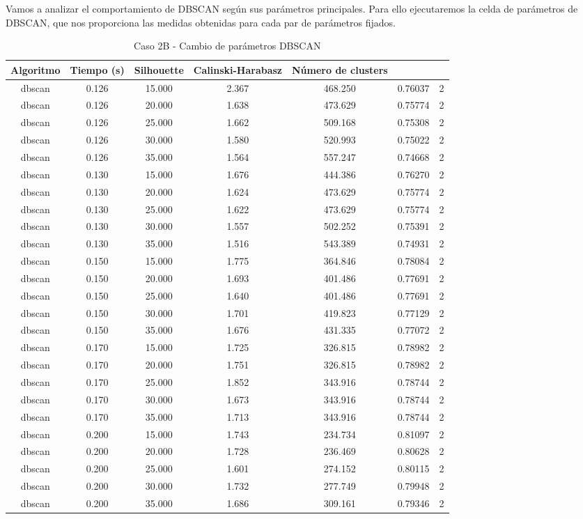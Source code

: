 Vamos a analizar el comportamiento de DBSCAN según sus parámetros principales. Para ello ejecutaremos la celda de parámetros de DBSCAN, que nos proporciona las medidas obtenidas para cada par de parámetros fijados.

\begin{table}[H]
\centering
\caption{Caso 2B - Cambio de parámetros DBSCAN}
\label{tab:c2B_dbscan}
\begin{tabular}{ccccccc}
\toprule
 Algoritmo & Tiempo (s) & Silhouette & Calinski-Harabasz & Número de clusters \\
\midrule
dbscan & 0.126 & 15.000 & 2.367 & 468.250 & 0.76037 & 2 \\
dbscan & 0.126 & 20.000 & 1.638 & 473.629 & 0.75774 & 2 \\
dbscan & 0.126 & 25.000 & 1.662 & 509.168 & 0.75308 & 2 \\
dbscan & 0.126 & 30.000 & 1.580 & 520.993 & 0.75022 & 2 \\
dbscan & 0.126 & 35.000 & 1.564 & 557.247 & 0.74668 & 2 \\
dbscan & 0.130 & 15.000 & 1.676 & 444.386 & 0.76270 & 2 \\
dbscan & 0.130 & 20.000 & 1.624 & 473.629 & 0.75774 & 2 \\
dbscan & 0.130 & 25.000 & 1.622 & 473.629 & 0.75774 & 2 \\
dbscan & 0.130 & 30.000 & 1.557 & 502.252 & 0.75391 & 2 \\
dbscan & 0.130 & 35.000 & 1.516 & 543.389 & 0.74931 & 2 \\
dbscan & 0.150 & 15.000 & 1.775 & 364.846 & 0.78084 & 2 \\
dbscan & 0.150 & 20.000 & 1.693 & 401.486 & 0.77691 & 2 \\
dbscan & 0.150 & 25.000 & 1.640 & 401.486 & 0.77691 & 2 \\
dbscan & 0.150 & 30.000 & 1.701 & 419.823 & 0.77129 & 2 \\
dbscan & 0.150 & 35.000 & 1.676 & 431.335 & 0.77072 & 2 \\
dbscan & 0.170 & 15.000 & 1.725 & 326.815 & 0.78982 & 2 \\
dbscan & 0.170 & 20.000 & 1.751 & 326.815 & 0.78982 & 2 \\
dbscan & 0.170 & 25.000 & 1.852 & 343.916 & 0.78744 & 2 \\
dbscan & 0.170 & 30.000 & 1.673 & 343.916 & 0.78744 & 2 \\
dbscan & 0.170 & 35.000 & 1.713 & 343.916 & 0.78744 & 2 \\
dbscan & 0.200 & 15.000 & 1.743 & 234.734 & 0.81097 & 2 \\
dbscan & 0.200 & 20.000 & 1.728 & 236.469 & 0.80628 & 2 \\
dbscan & 0.200 & 25.000 & 1.601 & 274.152 & 0.80115 & 2 \\
dbscan & 0.200 & 30.000 & 1.732 & 277.749 & 0.79948 & 2 \\
dbscan & 0.200 & 35.000 & 1.686 & 309.161 & 0.79346 & 2 \\
\bottomrule
\end{tabular}
\end{table}

